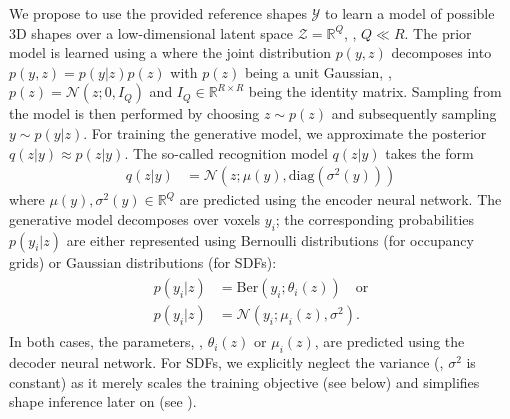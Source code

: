 %
We propose to use the provided reference shapes $\mathcal{Y}$ to learn a model of possible 3D shapes over a low-dimensional latent space $\mathcal{Z} = \mathbb{R}^Q$, \ie,  $Q \ll R$. The prior model is learned using a \VAE where the joint distribution $p(y, z)$ decomposes into $p(y, z) = p(y | z)p(z)$ with $p(z)$ being a unit Gaussian, \ie, $p(z) = \mathcal{N}(z;0, I_Q)$ and $I_Q \in \mathbb{R}^{R \times R}$ being the identity matrix. Sampling from the model is then performed by choosing $z \sim p(z)$ and subsequently sampling $y \sim p(y | z)$. For training the generative model, we approximate the posterior $q(z | y) \approx p(z | y)$. The so-called recognition model $q(z | y)$ takes the form
%
\begin{align}
q(z | y) &= \mathcal{N}(z; \mu(y), \text{diag}(\sigma^2(y)))\label{eq:encoder-decoder}
\end{align}
%
where $\mu(y), \sigma^2(y) \in \mathbb{R}^Q$ are predicted using the encoder neural network. The generative model decomposes over voxels $y_i$; the corresponding probabilities $p(y_i | z)$ are either represented using Bernoulli distributions (for occupancy grids) or Gaussian distributions (for SDFs):
%
\begin{align}
    \begin{split}
        p(y_i | z) &= \text{Ber}(y_i ; \theta_i(z))\quad\text{or}\\
        p(y_i | z) &= \mathcal{N}(y_i ; \mu_i(z), \sigma^2).\label{eq:decoder}
    \end{split}
\end{align}
%
In both cases, the parameters, \ie, $\theta_i(z)$ or $\mu_i(z)$, are predicted using the decoder neural network. For SDFs, we explicitly neglect the variance (\ie, $\sigma^2$ is constant) as it merely scales the training objective (see below) and simplifies shape inference later on (see ).

